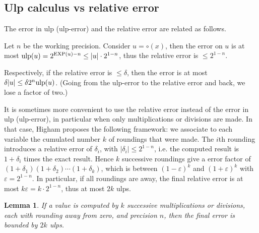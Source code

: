 \documentclass[12pt]{amsart}
\def\ulp{{\rm ulp}}
\def\Exp{{\rm EXP}}
\newtheorem{lemma}{Lemma}
\begin{document}
\subsection{Ulp calculus vs relative error}

The error in ulp (ulp-error) and the relative error are related as follows.

Let $n$ be the working precision.
Consider $u = \circ(x)$, then the error on $u$ is at most
$\ulp(u) = 2^{\Exp(u)-n} \leq |u| \cdot 2^{1-n}$, thus the relative error
is $\leq 2^{1-n}$.

Respectively, if the relative error is $\leq \delta$, then the error
is at most $\delta |u| \leq \delta 2^n \ulp(u)$. (Going from the ulp-error
to the relative error and back, we lose a factor of two.)

It is sometimes more convenient to use the relative error instead of the
error in ulp (ulp-error), in particular when only multiplications or
divisions are made.
In that case,
Higham \cite{Higham02} proposes the following framework:
we associate to each variable the cumulated number $k$ of roundings that were
made.
The $i$th rounding introduces a relative error of $\delta_i$,
with $|\delta_i| \leq 2^{1-n}$, i.e. the computed result is
$1+\delta_i$ times the exact result.
Hence $k$ successive roundings give a error factor of $(1+\delta_1)
(1+\delta_2) \cdots (1+\delta_k)$, which is between $(1-\varepsilon)^k$
and $(1+\varepsilon)^k$ with $\varepsilon = 2^{1-n}$.
In particular, if all roundings are away, the final relative error is
at most $k \varepsilon = k \cdot 2^{1-n}$, thus at most $2k$ ulps.

\begin{lemma} \label{rel_ulp}
If a value is computed by $k$ successive multiplications or divisions,
each with rounding away from zero, and precision $n$, then the final
error is bounded by $2k$ ulps.
\end{lemma}
\end{document}

